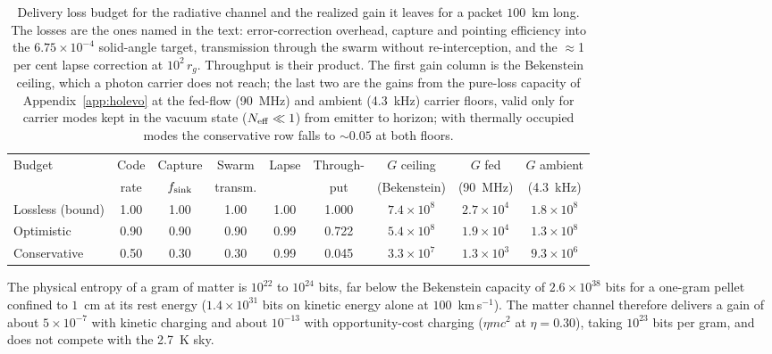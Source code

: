 \documentclass[11pt]{article}
\begin{document}
\begin{table}[tbp]
\centering
\caption{Delivery loss budget for the radiative channel and the realized gain it leaves for a packet $100$~km long. The losses are the ones named in the
text: error-correction overhead, capture and pointing efficiency into the
$6.75\times10^{-4}$ solid-angle target, transmission through the swarm
without re-interception, and the $\approx$1 per cent lapse correction at
$10^{2}\,r_g$. Throughput is their product. The first gain column is the
Bekenstein ceiling, which a photon carrier does not reach; the last two are the
gains from the pure-loss capacity of Appendix~\ref{app:holevo} at the
fed-flow (90~MHz) and ambient (4.3~kHz) carrier floors, valid only for carrier modes kept
in the vacuum state ($N_{\rm eff}\ll1$) from emitter to horizon; with thermally occupied modes
the conservative row falls to $\sim 0.05$ at both floors.}
\label{tab:delivery}
\footnotesize
\setlength{\tabcolsep}{4pt}
\begin{tabular}{lcccccccc}
\toprule
Budget & Code & Capture & Swarm & Lapse & Through- & $G$ ceiling & $G$ fed & $G$ ambient \\
 & rate & $f_{\rm sink}$ & transm. & & put & (Bekenstein) & (90~MHz) & (4.3~kHz) \\
\midrule
Lossless (bound) & 1.00 & 1.00 & 1.00 & 1.00 & 1.000 & $7.4\times10^{8}$ & $2.7\times10^{4}$ & $1.8\times10^{8}$ \\
Optimistic & 0.90 & 0.90 & 0.90 & 0.99 & 0.722 & $5.4\times10^{8}$ & $1.9\times10^{4}$ & $1.3\times10^{8}$ \\
Conservative & 0.50 & 0.30 & 0.30 & 0.99 & 0.045 & $3.3\times10^{7}$ & $1.3\times10^{3}$ & $9.3\times10^{6}$ \\
\bottomrule
\end{tabular}
\end{table}

The physical entropy of a gram of matter is $10^{22}$ to $10^{24}$ bits, far below the Bekenstein capacity of $2.6\times10^{38}$ bits for a one-gram pellet confined to $1$~cm at its rest energy ($1.4\times10^{31}$ bits on kinetic energy alone at $100$~km\,s$^{-1}$). The matter channel therefore delivers a gain of about $5\times10^{-7}$ with kinetic charging and about $10^{-13}$ with opportunity-cost charging ($\eta mc^{2}$ at $\eta = 0.30$), taking $10^{23}$ bits per gram, and does not compete with the 2.7~K sky.
\end{document}
